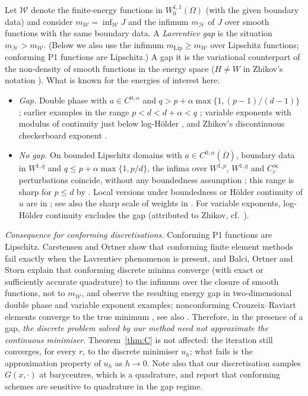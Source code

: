 \documentclass[11pt]{amsart}
\theoremstyle{definition}
\theoremstyle{remark}
\numberwithin{equation}{section}
\begin{document}
Let $\mathcal W$ denote the finite-energy functions in $W^{1,1}_0(\Omega)$ (with the given boundary data) and consider $m_{\mathcal W}=\inf_{\mathcal W}J$ and the infimum $m_{\mathcal H}$ of $J$ over smooth functions with the same boundary data. A \emph{Lavrentiev gap} is the situation $m_{\mathcal H}>m_{\mathcal W}$. (Below we also use the infimum $m_{\mathrm{Lip}}\ge m_{\mathcal W}$ over Lipschitz functions; conforming P1 functions are Lipschitz.) A gap it is the variational counterpart of the non-density of smooth functions in the energy space ($H\ne W$ in Zhikov's notation \cite{Zhikov1986,Zhikov1995}). What is known for the energies of interest here:
\begin{itemize}[leftmargin=1.5em]
\item \emph{Gap.} Double phase with $a\in C^{0,\alpha}$ and $q>p+\alpha\max\{1,(p-1)/(d-1)\}$ \cite[Thm.~32]{BDS2020}; earlier examples in the range $p<d<d+\alpha<q$ \cite{Zhikov1995,ELM2004}; variable exponents with modulus of continuity just below log-H\"older \cite[Thm.~30]{BDS2020}, and Zhikov's discontinuous checkerboard exponent \cite{Zhikov1986}.
\item \emph{No gap.} On bounded Lipschitz domains with $a\in C^{0,\alpha}(\overline\Omega)$, boundary data in $W^{1,q}$ and $q\le p+\alpha\max\{1,p/d\}$, the infima over $W^{1,p}$, $W^{1,q}$ and $C^\infty_c$ perturbations coincide, without any boundedness assumption \cite[Thm.~2.3]{BGS2022}; this range is sharp for $p\le d$ by \cite{BDS2020}. Local versions under boundedness or H\"older continuity of $u$ are in \cite[Thm.~1.4]{BaroniColomboMingione2018}; see also the sharp scale of weights in \cite{BCDM2024}. For variable exponents, log-H\"older continuity excludes the gap (attributed to Zhikov, cf.\ \cite{Zhikov1995}).
\end{itemize}

\emph{Consequence for conforming discretisations.} Conforming P1 functions are Lipschitz. Carstensen and Ortner \cite{CarstensenOrtner2010} show that conforming finite element methods fail exactly when the Lavrentiev phenomenon is present, and Balci, Ortner and Storn \cite{BalciOrtnerStorn2022} explain that conforming discrete minima converge (with exact or sufficiently accurate quadrature) to the infimum over the closure of smooth functions, not to $m_{\mathcal W}$, and observe the resulting energy gap in two-dimensional double phase and variable exponent examples; nonconforming Crouzeix--Raviart elements converge to the true minimum \cite[Thm.~1]{BalciOrtnerStorn2022}, see also \cite{Ortner2011,BalciKaltenbach2023}. Therefore, in the presence of a gap, \emph{the discrete problem solved by our method need not approximate the continuous minimiser}. Theorem~\ref{thm:C} is not affected: the iteration still converges, for every $r$, to the discrete minimiser $u_h$; what fails is the approximation property of $u_h$ as $h\to0$. Note also that our discretisation samples $G(x,\cdot)$ at barycentres, which is a quadrature, and \cite{BalciOrtnerStorn2022} report that conforming schemes are sensitive to quadrature in the gap regime.
\end{document}
